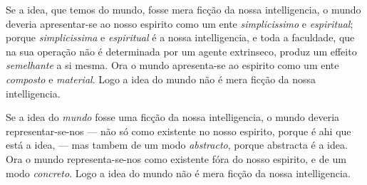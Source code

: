 
 Se a idea, que temos do mundo, fosse mera ficção da nossa intelligencia, o mundo
deveria apresentar-se ao nosso espirito como um ente \emph{simplicissimo} e
\emph{espiritual}; porque \emph{simplicissima} e \emph{espiritual} é a nossa
intelligencia, e toda a faculdade, que na sua operação não é determinada por um agente
extrinseco, produz um effeito \emph{semelhante} a si mesma. Ora o mundo apresenta-se ao
espirito como um ente \emph{composto} e \emph{material}. Logo a idea do mundo não é mera
ficção da nossa intelligencia.

 Se a idea do \emph{mundo} fosse uma ficção da nossa intelligencia, o mundo
deveria representar-se-nos --- não só como existente no nosso espirito, porque é ahi que
está a idea, --- mas tambem de um modo \emph{abstracto}, porque abstracta é a idea. Ora o
mundo representa-se-nos como existente fóra do nosso espirito, e de um modo
\emph{concreto}. Logo a idea do mundo não é mera ficção da nossa intelligencia.

